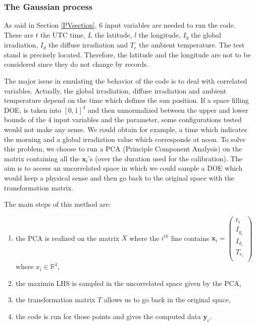 \documentclass[soumission]{jsfds}
\edef\hc{\string: }
\begin{document}
\subsubsection{The Gaussian process}
As said in Section \ref{PVsection}, $6$ input variables are needed to run the code. These are $t$ the UTC time, $L$ the latitude, $l$ the longitude, $I_g$ the global irradiation, $I_d$ the diffuse irradiation and $T_e$ the ambient temperature. The test stand is precisely located. Therefore, the latitude and the longitude are not to be considered since they do not change by records.\newline

The major issue in emulating the behavior of the code is to deal with correlated variables. Actually, the global irradiation, diffuse irradiation and ambient temperature depend on the time which defines the sun position. If a space filling DOE, is taken into $[0,1]^4$ and then unnormalized between the upper and lower bounds of the $4$ input variables and the parameter, some configurations tested would not make any sense. We could obtain for example, a time which indicates the morning and a global irradiation value which corresponds at noon. To solve this problem, we choose to run a PCA (Principle Component Analysis) on the matrix containing all the $\boldsymbol{x}_i$'s (over the duration used for the calibration). The aim is to access an uncorrelated space in which we could sample a DOE which would keep a physical sense and then go back to the original space with the transformation matrix. \newline

The main steps of this method are\hc
\begin{enumerate}
\item the PCA is realized on the matrix $X$ where the $i^{th}$ line contains $\boldsymbol{x}_i=\begin{pmatrix}
t_i\\
I_{g_i}\\
I_{d_i}\\
T_{e_i}\\
\end{pmatrix}$ where $x_i \in \mathbb{R}^4$,
\item the maximin LHS is sampled in the uncorrelated space given by the PCA,
\item the transformation matrix $T$ allows us to go back in the original space,
\item the code is run for those points and gives the computed data $\boldsymbol{y}_c$. \newline
\end{enumerate}
\end{document}
